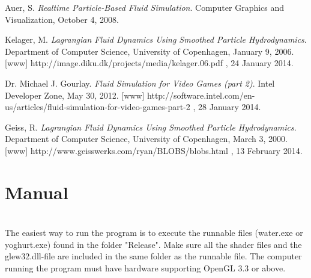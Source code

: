 \documentclass[a4paper,12pt,twoside,final]{report}
\begin{document}






\begin{thebibliography}{11}

  Auer, S.
  \emph{Realtime Particle-Based Fluid Simulation}.
  Computer Graphics and Visualization,
  October 4,
  2008.
  
  Kelager, M.
  \emph{Lagrangian Fluid Dynamics Using Smoothed Particle Hydrodynamics}.
  Department of Computer Science, University of Copenhagen,
  January 9,
  2006.
  [www] http://image.diku.dk/projects/media/kelager.06.pdf , 24 January 2014.
  
    Dr. Michael J. Gourlay.
  \emph{Fluid Simulation for Video Games (part 2)}.
  Intel Developer Zone,
  May 30,
  2012.
  [www] http://software.intel.com/en-us/articles/fluid-simulation-for-video-games-part-2 , 28 January 2014.  
  
  Geiss, R.
  \emph{Lagrangian Fluid Dynamics Using Smoothed Particle Hydrodynamics}.
  Department of Computer Science, University of Copenhagen,
  March 3,
  2000.
  [www] http://www.geisswerks.com/ryan/BLOBS/blobs.html , 13 February 2014.
  

  
\end{thebibliography}

\newpage


\appendix
\chapter{Manual}
 \\
\noindent The easiest way to run the program is to execute the runnable files (water.exe or yoghurt.exe) found in the folder "Release". Make sure all the shader files and the glew32.dll-file are included in the same folder as the runnable file. The computer running the program must have hardware supporting OpenGL 3.3 or above.
\end{document}
